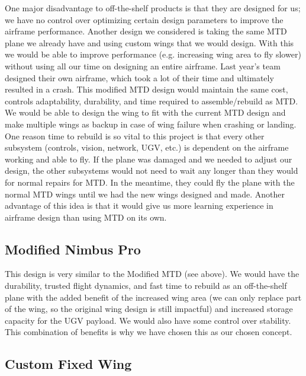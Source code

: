 \documentclass[]{auvsi_doc}
\begin{document}
One major disadvantage to off-the-shelf products is that they are designed for us; we have no control over optimizing certain design parameters to improve the airframe performance. Another design we considered is taking the same MTD plane we already have and using custom wings that we would design. With this we would be able to improve performance (e.g. increasing wing area to fly slower) without using all our time on designing an entire airframe. Last year's team designed their own airframe, which took a lot of their time and ultimately resulted in a crash. This modified MTD design would maintain the same cost, controls adaptability, durability, and time required to assemble/rebuild as MTD. We would be able to design the wing to fit with the current MTD design and make multiple wings as backup in case of wing failure when crashing or landing. One reason time to rebuild is so vital to this project is that every other subsystem (controls, vision, network, UGV, etc.) is dependent on the airframe working and able to fly. If the plane was damaged and we needed to adjust our design, the other subsystems would not need to wait any longer than they would for normal repairs for MTD. In the meantime, they could fly the plane with the normal MTD wings until we had the new wings designed and made. Another advantage of this idea is that it would give us more learning experience in airframe design than using MTD on its own.

\subsection{Modified Nimbus Pro}

This design is very similar to the Modified MTD (see above). We would have the durability, trusted flight dynamics, and fast time to rebuild as an off-the-shelf plane with the added benefit of the increased wing area (we can only replace part of the wing, so the original wing design is still impactful) and increased storage capacity for the UGV payload. We would also have some control over stability. This combination of benefits is why we have chosen this as our chosen concept.

\subsection{Custom Fixed Wing}
\end{document}
